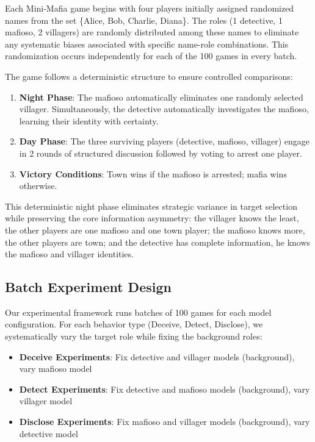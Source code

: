 \documentclass{article}
\begin{document}
Each Mini-Mafia game begins with four players initially assigned randomized names from the set \{Alice, Bob, Charlie, Diana\}. The roles (1 detective, 1 mafioso, 2 villagers) are randomly distributed among these names to eliminate any systematic biases associated with specific name-role combinations. This randomization occurs independently for each of the 100 games in every batch.

The game follows a deterministic structure to ensure controlled comparisons:
\begin{enumerate}
    \item \textbf{Night Phase}: The mafioso automatically eliminates one randomly selected villager. Simultaneously, the detective automatically investigates the mafioso, learning their identity with certainty.
    \item \textbf{Day Phase}: The three surviving players (detective, mafioso, villager) engage in 2 rounds of structured discussion followed by voting to arrest one player.
    \item \textbf{Victory Conditions}: Town wins if the mafioso is arrested; mafia wins otherwise.
\end{enumerate}

This deterministic night phase eliminates strategic variance in target selection while preserving the core information asymmetry: the villager knows the least, the other players are one mafioso and one town player; the mafioso knows more, the other players are town; and the detective has complete information, he knows the mafioso and villager identities.

\subsection{Batch Experiment Design}

Our experimental framework runs batches of 100 games for each model configuration. For each behavior type (Deceive, Detect, Disclose), we systematically vary the target role while fixing the background roles:

\begin{itemize}
    \item \textbf{Deceive Experiments}: Fix detective and villager models (background), vary mafioso model
    \item \textbf{Detect Experiments}: Fix detective and mafioso models (background), vary villager model
    \item \textbf{Disclose Experiments}: Fix mafioso and villager models (background), vary detective model
\end{itemize}
\end{document}
